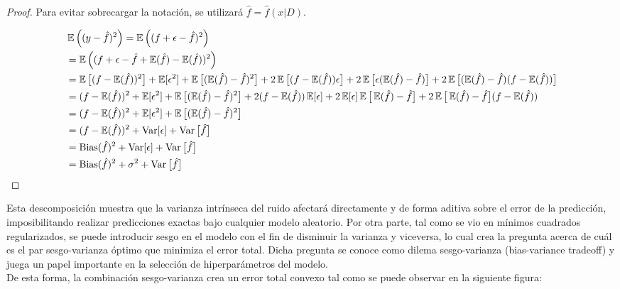 \begin{proof}

Para evitar sobrecargar la notación, se utilizará $\hat{f}=\hat{f}(x|D)$.

\begin{align*}
&\operatorname{\mathbb{E}}\left((y - \hat{f})^2\right) = \operatorname{\mathbb{E}}\left((f+\epsilon  - \hat{f} )^2\right) \\
 & = \operatorname{\mathbb{E}}\left((f+\epsilon  - \hat{f} +\operatorname{\mathbb{E}}(\hat{f})-\operatorname{\mathbb{E}}(\hat{f}))^2\right) \\
 & = \operatorname{\mathbb{E}}\big[(f-\operatorname{\mathbb{E}}(\hat{f}))^2\big]+\operatorname{\mathbb{E}}[\epsilon^2]+\operatorname{\mathbb{E}}\big[(\operatorname{\mathbb{E}}(\hat{f})- \hat{f})^2\big] 
+2\operatorname{\mathbb{E}}\big[(f-\operatorname{\mathbb{E}}(\hat{f}))\epsilon\big]
+2\operatorname{\mathbb{E}}\big[\epsilon(\operatorname{\mathbb{E}}(\hat{f})- \hat{f})\big]
+2\operatorname{\mathbb{E}}\big[(\operatorname{\mathbb{E}}(\hat{f})- \hat{f})(f-\operatorname{\mathbb{E}}(\hat{f}))\big] \\
 & = (f-\operatorname{\mathbb{E}}(\hat{f}))^2+\operatorname{\mathbb{E}}[\epsilon^2]+\operatorname{\mathbb{E}}\big[(\operatorname{\mathbb{E}}(\hat{f})- \hat{f})^2\big] 
+2(f-\operatorname{\mathbb{E}}(\hat{f}))\operatorname{\mathbb{E}}[\epsilon]
+2\operatorname{\mathbb{E}}[\epsilon]\operatorname{\mathbb{E}}\big[\operatorname{\mathbb{E}}(\hat{f})- \hat{f}\big]
+2\operatorname{\mathbb{E}}\big[\operatorname{\mathbb{E}}(\hat{f})- \hat{f}\big](f-\operatorname{\mathbb{E}}(\hat{f})) \\
 & = (f-\operatorname{\mathbb{E}}(\hat{f}))^2+\operatorname{\mathbb{E}}[\epsilon^2]+\operatorname{\mathbb{E}}\big[(\operatorname{\mathbb{E}}(\hat{f})- \hat{f})^2\big]\\
 & = (f-\operatorname{\mathbb{E}}(\hat{f}))^2+\operatorname{Var}[\epsilon]+\operatorname{Var}\big[\hat{f}\big]\\
 & = \operatorname{Bias}(\hat{f})^2+\operatorname{Var}[\epsilon]+\operatorname{Var}\big[\hat{f}\big]\\
 & = \operatorname{Bias}(\hat{f})^2+\sigma^2+\operatorname{Var}\big[\hat{f}\big]
\end{align*}
\end{proof}

Esta descomposición muestra que la varianza intrínseca del ruido afectará directamente y de forma aditiva sobre el error de la predicción, imposibilitando realizar predicciones exactas bajo cualquier modelo aleatorio. Por otra parte, tal como se vio en mínimos cuadrados regularizados, se puede introducir sesgo en el modelo con el fin de disminuir la varianza y viceversa, lo cual crea la pregunta acerca de cuál es el par sesgo-varianza óptimo que minimiza el error total. Dicha pregunta se conoce como dilema sesgo-varianza (bias-variance tradeoff) y juega un papel importante en la selección de hiperparámetros del modelo.\\

De esta forma, la combinación sesgo-varianza crea un error total convexo tal como se puede observar en la siguiente figura:


